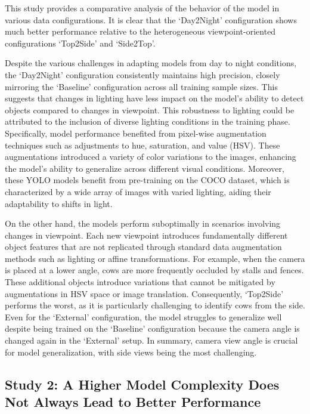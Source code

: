 This study provides a comparative analysis of the behavior of the model in various data configurations. It is clear that the `Day2Night' configuration shows much better performance relative to the heterogeneous viewpoint-oriented configurations `Top2Side' and `Side2Top'.

Despite the various challenges in adapting models from day to night conditions, the `Day2Night' configuration consistently maintains high precision, closely mirroring the `Baseline' configuration across all training sample sizes. This suggests that changes in lighting have less impact on the model's ability to detect objects compared to changes in viewpoint. This robustness to lighting could be attributed to the inclusion of diverse lighting conditions in the training phase. Specifically, model performance benefited from pixel-wise augmentation techniques such as adjustments to hue, saturation, and value (HSV). These augmentations introduced a variety of color variations to the images, enhancing the model's ability to generalize across different visual conditions. Moreover, these YOLO models benefit from pre-training on the COCO dataset, which is characterized by a wide array of images with varied lighting, aiding their adaptability to shifts in light.

On the other hand, the models perform suboptimally in scenarios involving changes in viewpoint. Each new viewpoint introduces fundamentally different object features that are not replicated through standard data augmentation methods such as lighting or affine transformations. For example, when the camera is placed at a lower angle, cows are more frequently occluded by stalls and fences. These additional objects introduce variations that cannot be mitigated by augmentations in HSV space or image translation. Consequently, `Top2Side' performs the worst, as it is particularly challenging to identify cows from the side. Even for the `External' configuration, the model struggles to generalize well despite being trained on the `Baseline' configuration because the camera angle is changed again in the `External' setup. In summary, camera view angle is crucial for model generalization, with side views being the most challenging.

\subsection*{Study 2: A Higher Model Complexity Does Not Always Lead to Better Performance}


